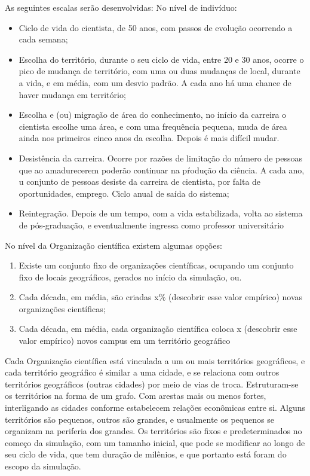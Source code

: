As seguintes escalas serão desenvolvidas:
No nível de indivíduo:
\begin{itemize}
    \item Ciclo de vida do cientista, de 50 anos, com passos de evolução ocorrendo a cada semana; 
    \item Escolha do território, durante o seu ciclo de vida, entre 20 e 30 anos, ocorre o pico de mudança de território, com uma ou duas mudanças de local, durante a vida, e em média, com um desvio padrão. A cada ano há uma chance de haver mudança em território;
    \item Escolha e (ou) migração de área do conhecimento, no início da carreira o cientista escolhe uma área, e com uma frequência pequena, muda  de área ainda nos primeiros cinco anos da escolha. Depois é mais difícil mudar.
    \item Desistência da carreira. Ocorre por razões de limitação do número de pessoas que ao amadurecerem poderão continuar na pŕodução da ciência. A cada ano, u conjunto de pessoas desiste da carreira de cientista, por falta de oportunidades, emprego. Ciclo anual de saída do sistema;
    \item Reintegração. Depois de um tempo, com a vida estabilizada, volta ao sistema de pós-graduação, e eventualmente ingressa como professor universitário
\end{itemize}

No nível da Organização científica existem algumas opções:
\begin{enumerate}
    \item Existe um conjunto fixo de organizações científicas, ocupando um conjunto fixo de locais geográficos, gerados no início da simulação, ou.
    \item Cada década, em média, são criadas x\% (descobrir esse valor empírico) novas organizações científicas;
    \item Cada década, em média, cada organização científica coloca x (descobrir esse valor empírico) novos campus em um território geográfico
\end{enumerate}

Cada Organização científica está vinculada a um ou mais territórios geográficos, e cada território geográfico é similar a uma cidade, e se relaciona com outros territórios geográficos (outras cidades) por meio de vias de troca. Estruturam-se os territórios na forma de um grafo. Com arestas mais ou menos fortes, interligando as cidades conforme estabelecem relações econômicas entre si. Alguns territórios são pequenos, outros são grandes, e usualmente os pequenos se organizam na periferia dos grandes. Os territórios são fixos e predeterminados no começo da simulação, com um tamanho inicial, que pode se modificar ao longo de seu ciclo de vida, que tem duração de milênios, e que portanto está foram do escopo da simulação. 


